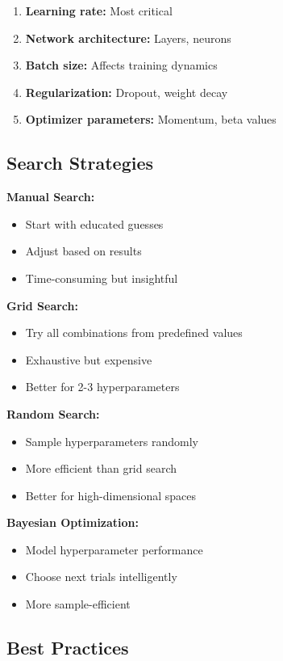 \begin{enumerate}
    \item \textbf{Learning rate:} Most critical
    \item \textbf{Network architecture:} Layers, neurons
    \item \textbf{Batch size:} Affects training dynamics
    \item \textbf{Regularization:} Dropout, weight decay
    \item \textbf{Optimizer parameters:} Momentum, beta values
\end{enumerate}

\subsection{Search Strategies}

\textbf{Manual Search:}
\begin{itemize}
    \item Start with educated guesses
    \item Adjust based on results
    \item Time-consuming but insightful
\end{itemize}

\textbf{Grid Search:}
\begin{itemize}
    \item Try all combinations from predefined values
    \item Exhaustive but expensive
    \item Better for 2-3 hyperparameters
\end{itemize}

\textbf{Random Search:}
\begin{itemize}
    \item Sample hyperparameters randomly
    \item More efficient than grid search
    \item Better for high-dimensional spaces
\end{itemize}

\textbf{Bayesian Optimization:}
\begin{itemize}
    \item Model hyperparameter performance
    \item Choose next trials intelligently
    \item More sample-efficient
\end{itemize}

\subsection{Best Practices}

